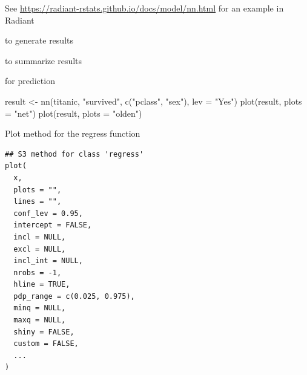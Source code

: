 \documentclass[a4paper]{book}
\begin{document}
%
\begin{Details}
See \url{https://radiant-rstats.github.io/docs/model/nn.html} for an example in Radiant
\end{Details}
%
\begin{SeeAlso}
 to generate results

 to summarize results

 for prediction
\end{SeeAlso}
%
\begin{Examples}
\begin{ExampleCode}
result <- nn(titanic, "survived", c("pclass", "sex"), lev = "Yes")
plot(result, plots = "net")
plot(result, plots = "olden")
\end{ExampleCode}
\end{Examples}
%
\begin{Description}
Plot method for the regress function
\end{Description}
%
\begin{Usage}
\begin{verbatim}
## S3 method for class 'regress'
plot(
  x,
  plots = "",
  lines = "",
  conf_lev = 0.95,
  intercept = FALSE,
  incl = NULL,
  excl = NULL,
  incl_int = NULL,
  nrobs = -1,
  hline = TRUE,
  pdp_range = c(0.025, 0.975),
  minq = NULL,
  maxq = NULL,
  shiny = FALSE,
  custom = FALSE,
  ...
)
\end{verbatim}
\end{Usage}
%
\end{document}
